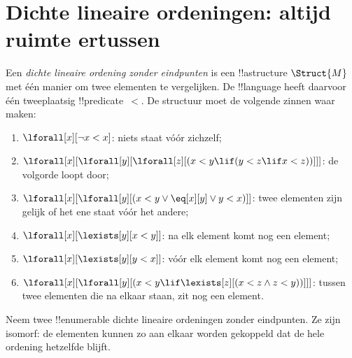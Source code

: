 \documentclass[openany]{memoir}
\begin{document}
\begingroup
\def\olfilename{OLP-0190}
\def\olfilepath{content/model-theory/basics/}
\hypertarget{unit-OLP-0190}{}



\section{Dichte lineaire ordeningen: altijd ruimte ertussen}

\begin{defn}
  Een \emph{dichte lineaire ordening zonder eindpunten} is een !!a{structure}
  $\Struct{M}$ met één manier om twee elementen te vergelijken. De
  !!{language} heeft daarvoor één tweeplaatsig !!{predicate}~$<$. De
  structuur moet de volgende zinnen waar maken:
  \begin{enumerate}
  \item $\lforall[x][\lnot x < x]$: niets staat vóór zichzelf;
  \item $\lforall[x][\lforall[y][\lforall[z][(x < y \lif (y < z \lif x
    <z ))]]]$: de volgorde loopt door;
  \item $\lforall[x][\lforall[y][(x< y \lor \eq[x][y] \lor y < x)]]$:
    twee elementen zijn gelijk of het ene staat vóór het andere;
  \item $\lforall[x][\lexists[y][x < y]]$: na elk element komt nog een element;
  \item $\lforall[x][\lexists[y][y < x]]$: vóór elk element komt nog een element;
  \item $\lforall[x][\lforall[y][(x < y \lif \lexists[z][(x < z \land
        z < y))]]]$: tussen twee elementen die na elkaar staan, zit nog een element.
 \end{enumerate}
\end{defn}

\begin{thm}
  Neem twee !!{enumerable} dichte lineaire ordeningen zonder
  eindpunten. Ze zijn isomorf: de elementen kunnen zo aan elkaar worden
  gekoppeld dat de hele ordening hetzelfde blijft.
\end{thm}
\end{document}
